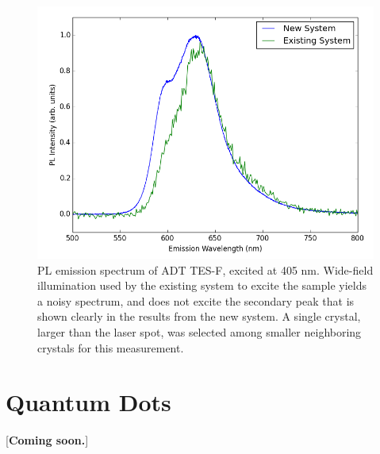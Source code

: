 \begin{figure}[h]
    \centering
    \includegraphics[width=.8\textwidth]{./img/tesf-2.png}%
    \caption{PL emission spectrum of ADT TES-F, excited at 405 nm.
    Wide-field illumination used by the existing system to excite the sample
    yields a noisy spectrum, and does not excite the secondary peak that is 
    shown clearly in the results from the new system. A single crystal, larger than the laser spot, was selected among smaller neighboring crystals for this measurement. %
    }
    \label{fig:pl-adt-tesf}
\end{figure}

\section{ Quantum Dots}

[\textbf{Coming soon.}]

